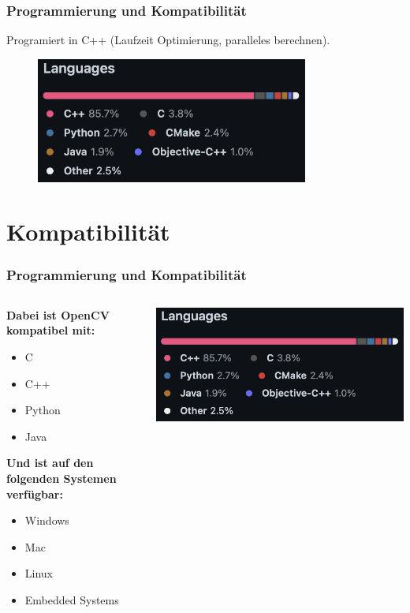 \documentclass{beamer}
\begin{document}
\begin{frame} \frametitle{Programmierung und Kompatibilität}
	Programiert in C++ (Laufzeit Optimierung, paralleles berechnen).
	\begin{figure}
		\centering
		\includegraphics[width=0.8\textwidth]{Bilder/CodeBase.png}
		\label{a4}
	\end{figure}
\cite{GitHub, Bradski2008}
\end{frame}

\section{Kompatibilität}
\begin{frame} \frametitle{Programmierung und Kompatibilität}
\begin{columns}
\begin{column}{0.5\textwidth}
			\textbf{Dabei ist OpenCV kompatibel mit:}
			\begin{itemize}
				\item C
				\item C++
				\item Python
				\item Java
			\end{itemize}
		\textbf{Und ist auf den folgenden Systemen verfügbar:}
		\begin{itemize}
			\item Windows
			\item Mac
			\item Linux
			\item Embedded Systems
		\end{itemize}
	\end{column}


	\begin{column}{0.5\textwidth}
			\centering
			\includegraphics[width=\textwidth]{Bilder/CodeBase.png}
	\end{column}
\end{columns}	
\end{frame}
\end{document}
